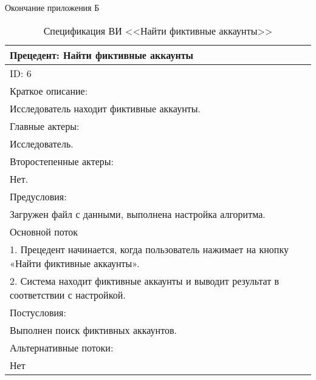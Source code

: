 \newpage
\begin{flushright}
Окончание приложения Б 
\end{flushright}
\vspace{-1.5em}
\begin{table}[H]
    \caption{Спецификация ВИ <<Найти фиктивные аккаунты>>}
    \vspace{1em}
    \begin{tabular}{|p{\textwidth}|}
       \hline
        Прецедент: Найти фиктивные аккаунты\\ \hline
        ID: 6\\ \hline
        Краткое описание: \\ Исследователь находит фиктивные аккаунты. \\ \hline
        Главные актеры: \\ Исследователь.\\ \hline
        Второстепенные актеры:\\ Нет. \\ \hline
        Предусловия: \\ Загружен файл с данными, выполнена настройка алгоритма. \\ \hline
        Основной поток\\ 
        1. Прецедент начинается, когда пользователь нажимает на кнопку «Найти фиктивные аккаунты». \\ 
        2. Система находит фиктивные аккаунты и выводит результат в соответствии с настройкой. \\  \hline
        Постусловия: \\ Выполнен поиск фиктивных аккаунтов. \\ \hline
        Альтернативные потоки: \\ Нет \\ \hline
        \end{tabular} 
    \label{tab:SearchFake}
\end{table}
\vspace{2em}




